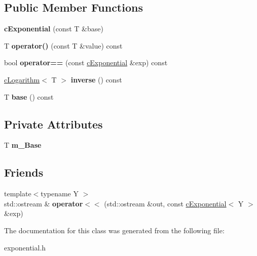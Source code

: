 \subsection*{Public Member Functions}
\begin{DoxyCompactItemize}
\item 
\hypertarget{classcExponential_ac268a87ae37b6e931a38ff7f1ae8c192}{{\bfseries c\-Exponential} (const T \&base)}\label{classcExponential_ac268a87ae37b6e931a38ff7f1ae8c192}

\item 
\hypertarget{classcExponential_a31700abf788cc7fd2e3be6c33caa5394}{T {\bfseries operator()} (const T \&value) const }\label{classcExponential_a31700abf788cc7fd2e3be6c33caa5394}

\item 
\hypertarget{classcExponential_a954417fe5ea791fa1477d64faf693309}{bool {\bfseries operator==} (const \hyperlink{classcExponential}{c\-Exponential} \&exp) const }\label{classcExponential_a954417fe5ea791fa1477d64faf693309}

\item 
\hypertarget{classcExponential_a0a8471eb3870d7b9b47d6b2bada9f4ef}{\hyperlink{classcLogarithm}{c\-Logarithm}$<$ T $>$ {\bfseries inverse} () const }\label{classcExponential_a0a8471eb3870d7b9b47d6b2bada9f4ef}

\item 
\hypertarget{classcExponential_a17cfbefd62eb737e1d262281e294e683}{T {\bfseries base} () const }\label{classcExponential_a17cfbefd62eb737e1d262281e294e683}

\end{DoxyCompactItemize}
\subsection*{Private Attributes}
\begin{DoxyCompactItemize}
\item 
\hypertarget{classcExponential_a6cd5555c6e9c51d6cc4dd17cbec576c9}{T {\bfseries m\-\_\-\-Base}}\label{classcExponential_a6cd5555c6e9c51d6cc4dd17cbec576c9}

\end{DoxyCompactItemize}
\subsection*{Friends}
\begin{DoxyCompactItemize}
\item 
\hypertarget{classcExponential_a21313c87124e4e14f9a16ea3420758b0}{{\footnotesize template$<$typename Y $>$ }\\std\-::ostream \& {\bfseries operator$<$$<$} (std\-::ostream \&out, const \hyperlink{classcExponential}{c\-Exponential}$<$ Y $>$ \&exp)}\label{classcExponential_a21313c87124e4e14f9a16ea3420758b0}

\end{DoxyCompactItemize}


The documentation for this class was generated from the following file\-:\begin{DoxyCompactItemize}
\item 
exponential.\-h\end{DoxyCompactItemize}
